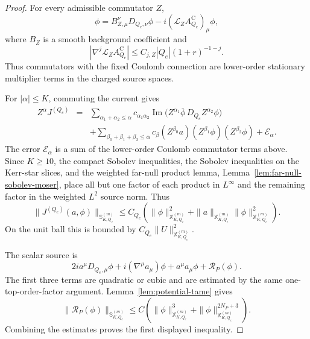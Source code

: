 \documentclass[11pt]{article}
\numberwithin{equation}{section}
\theoremstyle{plain}
\theoremstyle{definition}
\theoremstyle{remark}
\begin{document}
\begin{proof}
For every admissible commutator \(Z\),
\begin{equation}
 [Z,D_{Q_e,\mu}]\phi=B_{Z,\mu}^{\nu}D_{Q_e,\nu}\phi-i(\mathcal L_ZA^{\mathrm C}_{Q_e})_\mu\phi,
\end{equation}
where \(B_Z\) is a smooth background coefficient and
\begin{equation}
 |\nabla^j\mathcal L_ZA^{\mathrm C}_{Q_e}|\le C_{j,Z}|Q_e|(1+r)^{-1-j}.
\end{equation}
Thus commutators with the fixed Coulomb connection are lower-order stationary multiplier terms in the charged source spaces.

For \(|\alpha|\le K\), commuting the current gives
\begin{eqnarray}
 Z^{\alpha}J^{(Q_e)}
 &=&\sum_{\alpha_1+\alpha_2\le\alpha}c_{\alpha_1\alpha_2}
 \operatorname{Im}\bigl(Z^{\alpha_1}\overline\phi\,D_{Q_e}Z^{\alpha_2}\phi\bigr)\nonumber\\
 &&+\sum_{\beta_0+\beta_1+\beta_2\le\alpha}c_\beta
 (Z^{\beta_0}a)(Z^{\beta_1}\phi)(Z^{\beta_2}\phi)+\mathcal E_\alpha.
\end{eqnarray}
The error \(\mathcal E_\alpha\) is a sum of the lower-order Coulomb commutator terms above.  Since \(K\ge10\), the compact Sobolev inequalities, the Sobolev inequalities on the Kerr-star slices, and the weighted far-null product lemma, Lemma~\ref{lem:far-null-sobolev-moser}, place all but one factor of each product in \(L^\infty\) and the remaining factor in the weighted \(L^2\) source norm.  Thus
\begin{equation}
 \|J^{(Q_e)}(a,\phi)\|_{\mathbb S^{(m)}_{K,Q_e}}
 \le C_{Q_e}\left(\|\phi\|_{\mathbb X^{(m)}_{K,Q_e}}^2+
 \|a\|_{\mathbb X^{(m)}_{K,Q_e}}\|\phi\|_{\mathbb X^{(m)}_{K,Q_e}}^2\right).
\end{equation}
On the unit ball this is bounded by \(C_{Q_e}\|U\|_{\mathbb X^{(m)}_{K,Q_e}}^2\).

The scalar source is
\begin{equation}
 2ia^\mu D_{Q_e,\mu}\phi+i(\nabla^\mu a_\mu)\phi+a^\mu a_\mu\phi+\mathcal R_P(\phi).
\end{equation}
The first three terms are quadratic or cubic and are estimated by the same one-top-order-factor argument.  Lemma~\ref{lem:potential-tame} gives
\begin{equation}
 \|\mathcal R_P(\phi)\|_{\mathbb S^{(m)}_{K,Q_e}}
 \le C\left(\|\phi\|_{\mathbb X^{(m)}_{K,Q_e}}^3+
 \|\phi\|_{\mathbb X^{(m)}_{K,Q_e}}^{2N_P+3}\right).
\end{equation}
Combining the estimates proves the first displayed inequality.


\end{proof}
\end{document}
